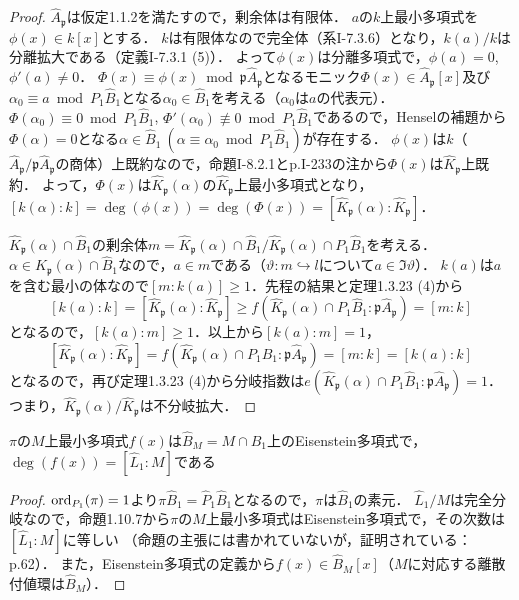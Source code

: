 \begin{proof}
  $\widehat{A}_\mathfrak{p}$は仮定1.1.2を満たすので，剰余体は有限体．
  $a$の$k$上最小多項式を$\phi(x)\in k[x]$とする．
  $k$は有限体なので完全体（系I-7.3.6）となり，$k(a)/k$は分離拡大である（定義I-7.3.1 (5)）．
  よって$\phi(x)$は分離多項式で，$\phi(a)=0$, $\phi'(a)\neq0$．
  $\Phi(x)\equiv\phi(x)\bmod\mathfrak{p}\widehat{A}_\mathfrak{p}$となるモニック$\Phi(x)\in\widehat{A}_\mathfrak{p}[x]$及び$\alpha_0\equiv a\bmod P_1\widehat{B}_1$となる$\alpha_0\in\widehat{B}_1$を考える（$\alpha_0$は$a$の代表元）．
  $\Phi(\alpha_0)\equiv 0\bmod P_1\widehat{B}_1$, $\Phi'(\alpha_0)\not\equiv 0\bmod P_1\widehat{B}_1$であるので，Henselの補題から$\Phi(\alpha)=0$となる$\alpha\in\widehat{B}_1\ (\alpha\equiv\alpha_0\bmod P_1\widehat{B}_1)$が存在する．
  $\phi(x)$は$k$（$\widehat{A}_\mathfrak{p}/\mathfrak{p}\widehat{A}_\mathfrak{p}$の商体）上既約なので，命題I-8.2.1とp.I-233の注から$\Phi(x)$は$\widehat{K}_\mathfrak{p}$上既約．
  よって，$\Phi(x)$は$\widehat{K}_\mathfrak{p}(\alpha)$の$\widehat{K}_\mathfrak{p}$上最小多項式となり，$[k(\alpha):k]=\deg (\phi(x))=\deg (\Phi(x))=[\widehat{K}_\mathfrak{p}(\alpha):\widehat{K}_\mathfrak{p}]$．

  $\widehat{K}_\mathfrak{p}(\alpha)\cap\widehat{B}_1$の剰余体$m=\widehat{K}_\mathfrak{p}(\alpha)\cap\widehat{B}_1/\widehat{K}_\mathfrak{p}(\alpha)\cap P_1\widehat{B}_1$を考える．
  $\alpha\in\widehat{K}_\mathfrak{p}(\alpha)\cap\widehat{B}_1$なので，$a\in m$である（$\vartheta\colon m \hookrightarrow l$について$a \in \Im \vartheta$）．
  $k(a)$は$a$を含む最小の体なので$[m:k(a)]\geq 1$．先程の結果と定理1.3.23 (4)から
  \[[k(a):k]=[\widehat{K}_\mathfrak{p}(\alpha):\widehat{K}_\mathfrak{p}]\geq f(\widehat{K}_\mathfrak{p}(\alpha)\cap P_1\widehat{B}_1:\mathfrak{p}\widehat{A}_\mathfrak{p})=[m:k]\]
  となるので，$[k(a):m]\geq 1$．以上から$[k(a):m]=1$，
  \[[\widehat{K}_\mathfrak{p}(\alpha):\widehat{K}_\mathfrak{p}]=f(\widehat{K}_\mathfrak{p}(\alpha)\cap P_1\widehat{B}_1:\mathfrak{p}\widehat{A}_\mathfrak{p})=[m:k]=[k(a):k]\]
  となるので，再び定理1.3.23 (4)から分岐指数は$e(\widehat{K}_\mathfrak{p}(\alpha)\cap P_1\widehat{B}_1:\mathfrak{p}\widehat{A}_\mathfrak{p})=1$．つまり，$\widehat{K}_\mathfrak{p}(\alpha)/\widehat{K}_\mathfrak{p}$は不分岐拡大．
\end{proof}

\begin{screen}
  $\pi$の$M$上最小多項式$f(x)$は$\widehat{B}_M = M\cap\widehat{B}_1$上のEisenstein多項式で，$\deg (f(x))=[\widehat{L}_1:M]$である
\end{screen}
\begin{proof}
  $\operatorname{ord}_{P_1}(\pi)=1$より$\pi\widehat{B}_1=\widehat{P}_1\widehat{B}_1$となるので，$\pi$は$\widehat{B}_1$の素元．
  $\widehat{L}_1/M$は完全分岐なので，命題1.10.7から$\pi$の$M$上最小多項式はEisenstein多項式で，その次数は$[\widehat{L}_1:M]$に等しい
  （命題の主張には書かれていないが，証明されている：p.62）．
  また，Eisenstein多項式の定義から$f(x)\in\widehat{B}_M[x]$（$M$に対応する離散付値環は$\widehat{B}_M$）．
\end{proof}

